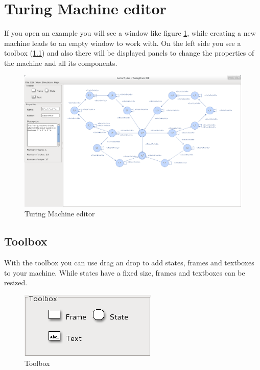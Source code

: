 \documentclass[%
  a4paper,%
  11pt,%
  blue,%
  hyperref	%
  ]{tubsartcl}
\begin{document}
\section{Turing Machine editor}
If you open an example you will see a window like figure \ref{pic:turing_editor}, while creating a new machine leads to an empty window to work with. On the left side you see a toolbox (\ref{sec:toolbox}) and also there will be displayed panels to change the properties of the machine and all its components.
\begin{figure}[!htb]
\begin{center}
\includegraphics[scale=0.3]{graphics_gui/turing_editor.png}
\end{center}
\caption{Turing Machine editor}
\label{pic:turing_editor}
\end{figure}

\newpage

\subsection{Toolbox}
\label{sec:toolbox}
With the toolbox you can use drag an drop to add states, frames and textboxes to your machine. While states have a fixed size, frames and textboxes can be resized.
\begin{figure}[!htb]
\begin{center}
\includegraphics[scale=0.5]{graphics_gui/toolbox_turing.png}
\end{center}
\caption{Toolbox}
\label{pic:toolbox}
\end{figure}
\end{document}
